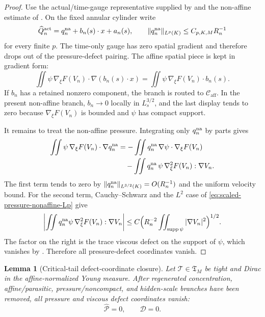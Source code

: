 \documentclass[11pt]{amsart}
\numberwithin{equation}{section}
\theoremstyle{plain}
\newtheorem{lemma}[lemma]{Lemma}
\theoremstyle{definition}
\theoremstyle{remark}
\newcommand{\supp}{\operatorname{supp}}
\newcommand{\Caff}{\mathcal C_{\mathrm{aff}}}
\newcommand{\Tcrit}{\mathfrak T_M}
\begin{document}
\begin{proof}
Use the actual/time-gauge representative supplied by
 and the non-affine
estimate of .  On the fixed annular
cylinder write
\[
   \widehat Q_n^{\rm act}
   =q_n^{\rm na}+b_n(s)\cdot x+a_n(s),
   \qquad
   \|q_n^{\rm na}\|_{L^p(K)}\le C_{p,K,M}R_n^{-1}
\]
for every finite \(p\).  The time-only gauge has zero spatial gradient and
therefore drops out of the pressure-defect pairing.  The affine spatial piece is
kept in gradient form:
\[
   \iint \psi\,\nabla_\xi F(V_n)\cdot\nabla(b_n(s)\cdot x)
   =
   \iint \psi\,\nabla_\xi F(V_n)\cdot b_n(s).
\]
If \(b_n\) has a retained nonzero component, the branch is routed to \(\Caff\).
In the present non-affine branch, \(b_n\to0\) locally in \(L^{3/2}_s\), and the
last display tends to zero because \(\nabla_\xi F(V_n)\) is bounded and
\(\psi\) has compact support.

It remains to treat the non-affine pressure.  Integrating only
\(q_n^{\rm na}\) by parts gives
\[
\begin{aligned}
\iint \psi\,\nabla_\xi F(V_n)\cdot\nabla q_n^{\rm na}
&=-\iint q_n^{\rm na}\,
   \nabla\psi\cdot\nabla_\xi F(V_n)  \\
&\quad
  -\iint q_n^{\rm na}\,
   \psi\,\nabla_\xi^2F(V_n):\nabla V_n .
\end{aligned}
\]
The first term tends to zero by
\(\|q_n^{\rm na}\|_{L^{3/2}(K)}=O(R_n^{-1})\) and the uniform velocity bound.
For the second term, Cauchy--Schwarz and the \(L^2\) case of
\eqref{eq:scaled-pressure-nonaffine-Lp} give
\[
\left|
\iint q_n^{\rm na}\psi\,
\nabla_\xi^2F(V_n):\nabla V_n
\right|
\le
C\Bigl(R_n^{-2}\iint_{\supp\psi}|\nabla V_n|^2\Bigr)^{1/2}.
\]
The factor on the right is the trace viscous defect on the support of \(\psi\),
which vanishes by .  Therefore all
pressure-defect coordinates vanish.
\end{proof}

\begin{lemma}[Critical-tail defect-coordinate closure]
\label{lem:critical-tail-defect-coordinate-routing}
\label{lem:critical-tail-defect-coordinate-closure}
Let \(\mathcal T\in\Tcrit\) be tight and Dirac in the affine-normalized Young
measure.  After regenerated concentration, affine/parasitic,
pressure/noncompact, and hidden-scale branches have been removed, all pressure
and viscous defect coordinates vanish:
\[
   \widehat{\mathscr P}=0,
   \qquad
   \mathscr D=0.
\]
\end{lemma}
\end{document}

